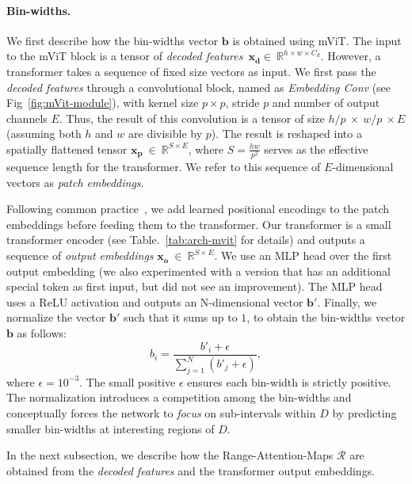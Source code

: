 \documentclass[final]{cvpr}
\begin{document}
\paragraph{Bin-widths.} We first describe how the bin-widths vector $\textbf{b}$ is obtained using mViT. The input to the mViT block is a tensor of \textit{decoded features}~$\mathbf{x_d}\in~\mathbb{R}^{h \times w \times C_d}$. However, a transformer takes a sequence of fixed size vectors as input. We first pass the \textit{decoded features} through a convolutional block, named as \textit{Embedding Conv} (see Fig~\ref{fig:mVit-module}), with kernel size $p\times p$, stride $p$ and number of output channels $E$. Thus, the result of this convolution is a tensor of size $h/p~\times~w/p~\times E$ (assuming both $h$ and $w$ are divisible by $p$). The result is reshaped into a spatially flattened tensor $\mathbf{x_p}~\in~\mathbb{R}^{S\times E}$, where $S=\frac{hw}{p^2}$ serves as the effective sequence length for the transformer. We refer to this sequence of $E$-dimensional vectors as \textit{patch embeddings}.

Following common practice~\cite{detr2020,dosovitskiy2020}, we add learned positional encodings to the patch embeddings before feeding them to the transformer. Our transformer is a small transformer encoder (see Table.~\ref{tab:arch-mvit} for details) and outputs a sequence of \textit{output embeddings} $\mathbf{x_o}~\in~\mathbb{R}^{S\times E}$. We use an MLP head over the first output embedding (we also experimented with a version that has an additional special token as first input, but did not see an improvement). The MLP head uses a ReLU activation and outputs an N-dimensional vector $\textbf{b}'$. Finally, we normalize the vector $\textbf{b}'$ such that it sums up to $1$, to obtain the bin-widths vector $\textbf{b}$ as follows:
\begin{equation}
    b_i = \frac{b'_i + \epsilon}{\sum_{j=1}^{N} (b'_j + \epsilon)},
\end{equation}
where $\epsilon=10^{-3}$. The small positive $\epsilon$ ensures each bin-width is strictly positive. The normalization introduces a competition among the bin-widths and conceptually forces the network to \textit{focus} on sub-intervals within $D$ by predicting smaller bin-widths at interesting regions of $D$. 

In the next subsection, we describe how the Range-Attention-Maps $\mathcal{R}$ are obtained from the \textit{decoded features} and the transformer output embeddings.
\end{document}
